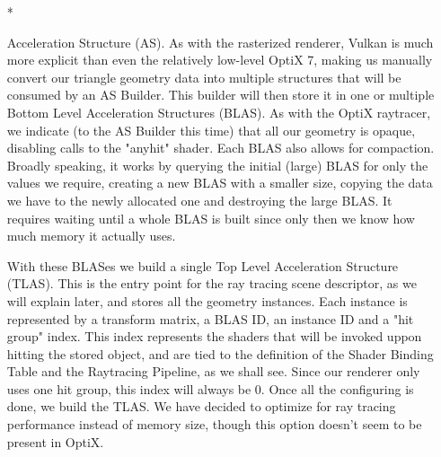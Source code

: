 \begin{itemize}
  \item[*]{Acceleration Structure (AS). As with the rasterized renderer, Vulkan is much more explicit than even the relatively low-level OptiX 7, making us manually convert our triangle geometry data into multiple structures that will be consumed by an AS Builder. This builder will then store it in one or multiple Bottom Level Acceleration Structures (BLAS). As with the OptiX raytracer, we indicate (to the AS Builder this time) that all our geometry is opaque, disabling calls to the "anyhit" shader. Each BLAS also allows for compaction. Broadly speaking, it works by querying the initial (large) BLAS for only the values we require, creating a new BLAS with a smaller size, copying the data we have to the newly allocated one and destroying the large BLAS. It requires waiting until a whole BLAS is built since only then we know how much memory it actually uses.

With these BLASes we build a single Top Level Acceleration Structure (TLAS). This is the entry point for the ray tracing scene descriptor, as we will explain later, and stores all the geometry instances. Each instance is represented by a transform matrix, a BLAS ID, an instance ID and a "hit group" index. This index represents the shaders that will be invoked uppon hitting the stored object, and are tied to the definition of the Shader Binding Table and the Raytracing Pipeline, as we shall see. Since our renderer only uses one hit group, this index will always be 0. Once all the configuring is done, we build the TLAS. We have decided to optimize for ray tracing performance instead of memory size, though this option doesn't seem to be present in OptiX.}


\end{itemize}
